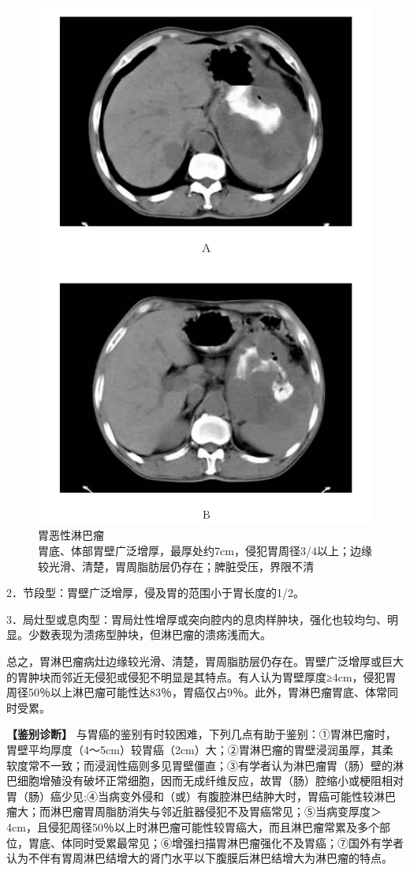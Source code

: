 \begin{figure}[!htbp]
 \centering
 \includegraphics[width=.7\textwidth,height=\textheight,keepaspectratio]{./images/Image00356.jpg}
 \captionsetup{justification=centering}
 \caption{胃恶性淋巴瘤\\{\small 胃底、体部胃壁广泛增厚，最厚处约7cm，侵犯胃周径3/4以上；边缘较光滑、清楚，胃周脂肪层仍存在；脾脏受压，界限不清}}
 \label{fig17-5}
  \end{figure} 

2．节段型：胃壁广泛增厚，侵及胃的范围小于胃长度的1/2。

3．局灶型或息肉型：胃局灶性增厚或突向腔内的息肉样肿块，强化也较均匀、明显。少数表现为溃疡型肿块，但淋巴瘤的溃疡浅而大。

总之，胃淋巴瘤病灶边缘较光滑、清楚，胃周脂肪层仍存在。胃壁广泛增厚或巨大的胃肿块而邻近无侵犯或侵犯不明显是其特点。有人认为胃壁厚度≥4cm，侵犯胃周径50％以上淋巴瘤可能性达83％，胃癌仅占9％。此外，胃淋巴瘤胃底、体常同时受累。

\textbf{【鉴别诊断】}
与胃癌的鉴别有时较困难，下列几点有助于鉴别：①胃淋巴瘤时，胃壁平均厚度（4～5cm）较胃癌（2cm）大；②胃淋巴瘤的胃壁浸润虽厚，其柔软度常不一致；而浸润性癌则多见胃壁僵直；③有学者认为淋巴瘤胃（肠）壁的淋巴细胞增殖没有破坏正常细胞，因而无成纤维反应，故胃（肠）腔缩小或梗阻相对胃（肠）癌少见;④当病变外侵和（或）有腹腔淋巴结肿大时，胃癌可能性较淋巴瘤大；而淋巴瘤胃周脂肪消失与邻近脏器侵犯不及胃癌常见；⑤当病变厚度＞4cm，且侵犯周径50％以上时淋巴瘤可能性较胃癌大，而且淋巴瘤常累及多个部位，胃底、体同时受累最常见；⑥增强扫描胃淋巴瘤强化不及胃癌；⑦国外有学者认为不伴有胃周淋巴结增大的肾门水平以下腹膜后淋巴结增大为淋巴瘤的特点。

